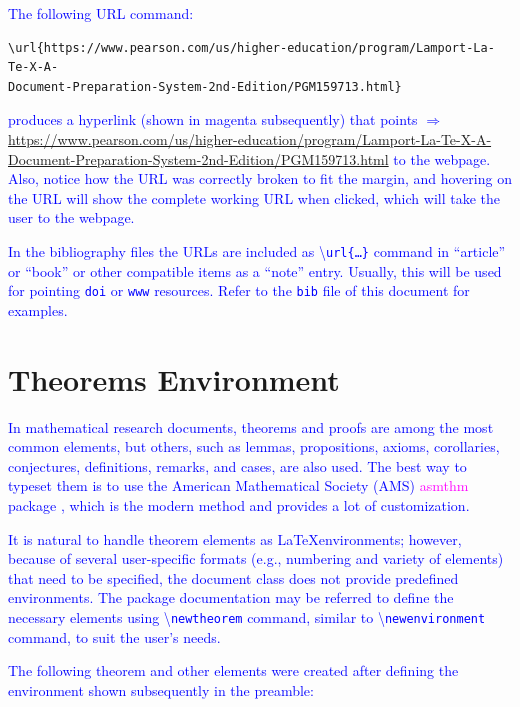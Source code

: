 \documentclass[phd,showframe]{ndsu-thesis-2022}
\newcommand\italk[1]{\textcolor{blue}{#1}}  %
\newcommand\cmd[1]{\textbackslash\texttt{#1}}  %
\begin{document}
\italk{The following URL command:} 
\vspace{-2ex}
\begin{verbatim}
\url{https://www.pearson.com/us/higher-education/program/Lamport-La-Te-X-A-
Document-Preparation-System-2nd-Edition/PGM159713.html}
\end{verbatim}

\noindent \italk{produces a hyperlink (shown in magenta subsequently) that points $\Rightarrow$ }\textcolor{magenta}{\url{https://www.pearson.com/us/higher-education/program/Lamport-La-Te-X-A-Document-Preparation-System-2nd-Edition/PGM159713.html}} \italk{to the webpage. Also, notice how the URL was correctly broken to fit the margin, and hovering on the URL will show the complete working URL when clicked, which will take the user to the webpage.}

\italk{In the bibliography files the URLs are included as \cmd{url\{\ldots\}} command in ``article'' or ``book'' or other compatible items as a ``note'' entry. Usually, this will be used for pointing \texttt{doi} or \texttt{www} resources. Refer to the \texttt{bib} file of this document for examples. } 

\mysectop
\section{Theorems Environment}

\italk{In mathematical research documents, theorems and proofs are among the most common elements, but others, such as lemmas, propositions, axioms, corollaries, conjectures, definitions, remarks, and cases, are also used. The best way to typeset them is to use the American Mathematical Society (AMS) \textcolor{magenta}{asmthm} package \citep{amsthm2017}, which is the modern method and provides a lot of customization.} 

\italk{It is natural to handle theorem elements as \LaTeX environments; however, because of several user-specific formats (e.g., numbering and variety of elements) that need to be specified, the document class does not provide predefined environments. The package documentation may be referred to define the necessary elements using \cmd{newtheorem} command, similar to \cmd{newenvironment} command, to suit the user's needs.} 

\italk{The following theorem and other elements were created after defining the environment shown subsequently in the preamble:}
\end{document}
